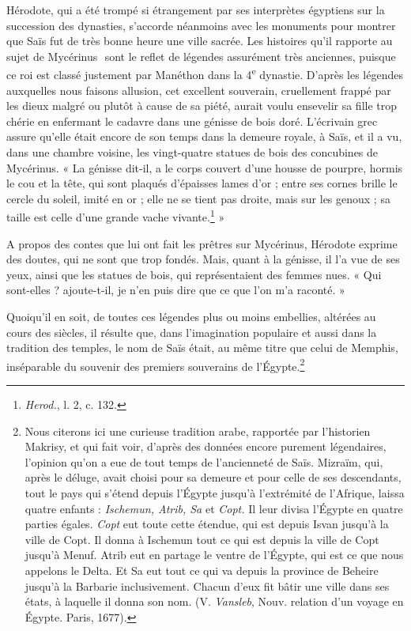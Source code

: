 \documentclass[letterpaper,twocolumn,openany,nodeprecatedcode]{dndbook}
\newcommand*\hieroAAGU{}
\begin{document}
Hérodote, qui a été trompé si étrangement par ses interprètes égyptiens sur la succession des dynasties, s'accorde néanmoins avec les monuments pour montrer que Saïs fut de très bonne heure une ville sacrée. Les histoires qu'il rapporte au sujet de Mycérinus $\hieroAAGU$ sont le reflet de légendes assurément très anciennes, puisque ce roi est classé justement par Manéthon dans la 4\textsuperscript{e} dynastie. D'après les légendes auxquelles nous faisons allusion, cet excellent souverain, cruellement frappé par les dieux malgré ou plutôt à cause de sa piété, aurait voulu ensevelir sa fille trop chérie en enfermant le cadavre dans une génisse de bois doré. L'écrivain grec assure qu'elle était encore de son temps dans la demeure royale, à Saïs, et il a vu, dans une chambre voisine, les vingt-quatre statues de bois des concubines de Mycérinus. « La génisse dit-il, a le corps couvert d'une housse de pourpre, hormis le cou et la tête, qui sont plaqués d'épaisses lames d'or ; entre ses cornes brille le cercle du soleil, imité en or ; elle ne se tient pas droite, mais sur les genoux ; sa taille est celle d'une grande vache vivante.\footnote{\emph{Herod.}, l. 2, c. 132.} »

A propos des contes que lui ont fait les prêtres sur Mycérinus, Hérodote exprime des doutes, qui ne sont que trop fondés. Mais, quant à la génisse, il l'a vue de ses yeux, ainsi que les statues de bois, qui représentaient des femmes nues. « Qui sont-elles ? ajoute-t-il, je n'en puis dire que ce que l'on m'a raconté. »

Quoiqu'il en soit, de toutes ces légendes plus ou moins embellies, altérées au cours des siècles, il résulte que, dans l'imagination populaire et aussi dans la tradition des temples, le nom de Saïs était, au même titre que celui de Memphis, inséparable du souvenir des premiers souverains de l'Égypte.\footnote{Nous citerons ici une curieuse tradition arabe, rapportée par l'historien Makrisy, et qui fait voir, d'après des données encore purement légendaires, l'opinion qu'on a eue de tout temps de l'ancienneté de Saïs. Mizraïm, qui, après le déluge, avait choisi pour sa demeure et pour celle de ses descendants, tout le pays qui s'étend depuis l'Égypte jusqu'à l'extrémité de l'Afrique, laissa quatre enfants : \emph{Ischemun, Atrib, Sa} et \emph{Copt.} Il leur divisa l'Égypte en quatre parties égales. \emph{Copt} eut toute cette étendue, qui est depuis Isvan jusqu'à la ville de Copt. Il donna à Ischemun tout ce qui est depuis la ville de Copt jusqu'à Menuf. Atrib eut en partage le ventre de l'Égypte, qui est ce que nous appelons le Delta. Et Sa eut tout ce qui va depuis la province de Beheire jusqu'à la Barbarie inclusivement. Chacun d'eux fit bâtir une ville dans ses états, à laquelle il donna son nom. (V. \emph{Vansleb}, Nouv. relation d'un voyage en Égypte. Paris, 1677).}
\end{document}
